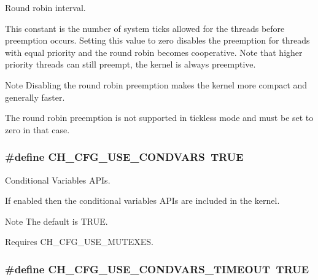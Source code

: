 Round robin interval. 

This constant is the number of system ticks allowed for the threads before preemption occurs. Setting this value to zero disables the preemption for threads with equal priority and the round robin becomes cooperative. Note that higher priority threads can still preempt, the kernel is always preemptive. \begin{DoxyNote}{Note}
Disabling the round robin preemption makes the kernel more compact and generally faster. 

The round robin preemption is not supported in tickless mode and must be set to zero in that case. 
\end{DoxyNote}
\hypertarget{group__config_ga73bc5a9da32221b5dd7759eed02a11fc}{
\subsubsection[{C\+H\+\_\+\+C\+F\+G\+\_\+\+U\+S\+E\+\_\+\+C\+O\+N\+D\+V\+A\+R\+S}]{\setlength{\rightskip}{0pt plus 5cm}\#define C\+H\+\_\+\+C\+F\+G\+\_\+\+U\+S\+E\+\_\+\+C\+O\+N\+D\+V\+A\+R\+S~T\+R\+U\+E}}\label{group__config_ga73bc5a9da32221b5dd7759eed02a11fc}


Conditional Variables A\+P\+Is. 

If enabled then the conditional variables A\+P\+Is are included in the kernel.

\begin{DoxyNote}{Note}
The default is {\ttfamily T\+R\+U\+E}. 

Requires {\ttfamily C\+H\+\_\+\+C\+F\+G\+\_\+\+U\+S\+E\+\_\+\+M\+U\+T\+E\+X\+E\+S}. 
\end{DoxyNote}
\hypertarget{group__config_gae286dae62e72f6bd17ecfbd69194b1bb}{
\subsubsection[{C\+H\+\_\+\+C\+F\+G\+\_\+\+U\+S\+E\+\_\+\+C\+O\+N\+D\+V\+A\+R\+S\+\_\+\+T\+I\+M\+E\+O\+U\+T}]{\setlength{\rightskip}{0pt plus 5cm}\#define C\+H\+\_\+\+C\+F\+G\+\_\+\+U\+S\+E\+\_\+\+C\+O\+N\+D\+V\+A\+R\+S\+\_\+\+T\+I\+M\+E\+O\+U\+T~T\+R\+U\+E}}\label{group__config_gae286dae62e72f6bd17ecfbd69194b1bb}


